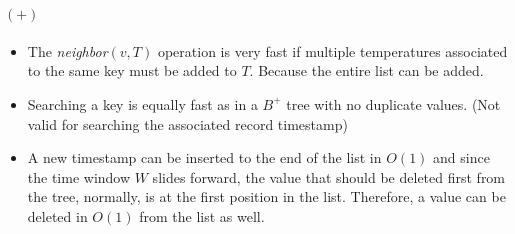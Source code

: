 \documentclass[abstracton,12pt]{scrreprt}
\begin{document}
\paragraph{$(+)$}
\begin{itemize}  
	\item  The \emph{neighbor}$(v,T)$ operation is very fast if multiple temperatures associated to the same key must be added to $T$. Because the entire list can be added. 
	\item Searching a key is equally fast as in a $B^+$ tree with no duplicate values. (Not valid for searching  the associated record timestamp)
	\item A new timestamp can be inserted to the end of the list in $O(1)$ and since the time window $W$ slides forward, the value that should be deleted first from the tree, normally, is at the first position in the list. Therefore, a value can be deleted in $O(1)$ from the list as well. 
\end{itemize}
\end{document}
